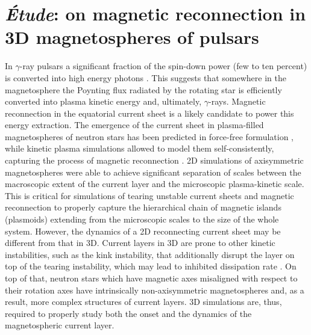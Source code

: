 \newcommand\runit{{\hat{\bm{r}}}}
\newcommand\thetaunit{{\hat{\bm{\theta}}}}
\newcommand\phiunit{{\hat{\bm{\phi}}}}

\chapter{{\it \'Etude}: on magnetic reconnection in 3D magnetospheres of pulsars}

\label{ch:pulsar}

In $\gamma$-ray pulsars a significant fraction of the spin-down power (few to ten percent) is converted into high energy photons \citep{2013ApJS..208...17A}. This suggests that somewhere in the magnetosphere the Poynting flux radiated by the rotating star is efficiently converted into plasma kinetic energy and, ultimately, $\gamma$-rays. Magnetic reconnection in the equatorial current sheet is a likely candidate to power this energy extraction. The emergence of the current sheet in plasma-filled magnetospheres of neutron stars has been predicted in force-free formulation \citep{1999ApJ...511..351C, 2006ApJ...648L..51S}, while kinetic plasma simulations allowed to model them self-consistently, capturing the process of magnetic reconnection \citep{2014ApJ...785L..33P,2014ApJ...795L..22C,2015MNRAS.448..606C,2015MNRAS.449.2759B,2020A&A...642A.204C}. 2D simulations of axisymmetric magnetospheres were able to achieve significant separation of scales between the macroscopic extent of the current layer and the microscopic plasma-kinetic scale. This is critical for simulations of tearing unstable current sheets and magnetic reconnection to properly capture the hierarchical chain of magnetic islands (plasmoids) extending from the microscopic scales to the size of the whole system. However, the dynamics of a 2D reconnecting current sheet may be different from that in 3D. Current layers in 3D are prone to other kinetic instabilities, such as the kink instability, that additionally disrupt the layer on top of the tearing instability, which may lead to inhibited dissipation rate \citep{2021arXiv210500009Z,2020arXiv200802743G,2021arXiv210602790W}. On top of that, neutron stars which have magnetic axes misaligned with respect to their rotation axes have intrinsically non-axisymmetric magnetospheres and, as a result, more complex structures of current layers. 3D simulations are, thus, required to properly study both the onset and the dynamics of the magnetospheric current layer.

